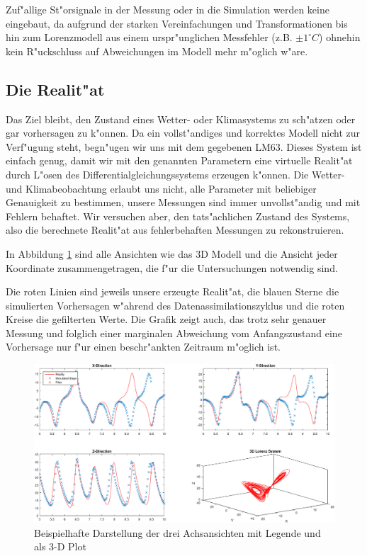 \begin{refsection}
Zuf"allige St"orsignale in der Messung oder in die Simulation werden keine eingebaut, da aufgrund der starken Vereinfachungen und Transformationen bis hin zum Lorenzmodell aus einem urspr"unglichen Messfehler (z.B. $\pm1^\circ C$) ohnehin kein R"uckschluss auf Abweichungen im Modell mehr m"oglich w"are.


\subsection{Die Realit"at}
Das Ziel bleibt, den Zustand eines Wetter- oder Klimasystems zu sch"atzen oder gar vorhersagen zu k"onnen. Da ein vollst"andiges und korrektes Modell nicht zur Verf"ugung steht, begn"ugen wir uns mit dem gegebenen LM63. Dieses System ist einfach genug, damit wir mit den genannten Parametern eine virtuelle Realit"at durch L"osen des Differentialgleichungssystems erzeugen k"onnen. Die Wetter- und Klimabeobachtung erlaubt uns nicht, alle Parameter mit beliebiger Genauigkeit zu bestimmen, unsere Messungen sind immer unvollst"andig und mit Fehlern behaftet. Wir versuchen aber, den tats"achlichen Zustand des Systems, also die berechnete Realit"at aus fehlerbehaften Messungen zu rekonstruieren.

In Abbildung \ref{kalman:Oberfl} sind alle Ansichten wie das 3D Modell und die Ansicht jeder Koordinate zusammengetragen, die f"ur die Untersuchungen notwendig sind.

Die roten Linien sind jeweils unsere erzeugte Realit"at, die blauen Sterne die simulierten Vorhersagen w"ahrend des Datenassimilationszyklus und die roten Kreise die gefilterten Werte. Die Grafik zeigt auch, das trotz sehr genauer Messung und folglich einer marginalen Abweichung vom Anfangszustand eine Vorhersage nur f"ur einen beschr"ankten Zeitraum m"oglich ist. 

\begin{figure}
\centering
\includegraphics[width=\hsize]{kalman/figures/3dsystemview.pdf}
\caption{Beispielhafte Darstellung der drei Achsansichten mit Legende und als 3-D Plot}
\label{kalman:Oberfl}
\end{figure}


\end{refsection}
